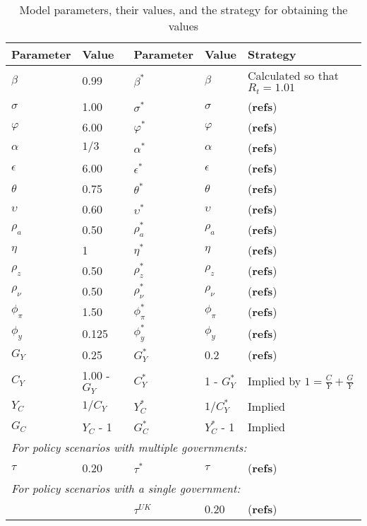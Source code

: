 \begin{table}[H] \label{table:model_parameters}
    \centering
    \begin{tabular}{ll|lll}
        Parameter & Value & Parameter & Value & Strategy \\
        \hline
        \hline
        $\beta$ & 0.99 & $\beta^*$ & $\beta$ & Calculated so that $R_t = 1.01$\\
        $\sigma$ & 1.00 & $\sigma^*$ & $\sigma$ & (\textbf{refs})\\
        $\varphi$ & 6.00 & $\varphi^*$ & $\varphi$ & (\textbf{refs})\\
        $\alpha$ & $1/3$ & $\alpha^*$ & $\alpha$ & (\textbf{refs})\\
        $\epsilon$ & 6.00 & $\epsilon^*$ & $\epsilon$ & (\textbf{refs})\\
        $\theta$ & 0.75 & $\theta^*$ & $\theta$ & (\textbf{refs})\\
        $\upsilon$ & 0.60 & $\upsilon^*$ & $\upsilon$ & (\textbf{refs})\\
        $\rho_a$ & 0.50 & $\rho_a^*$ & $\rho_a$ & (\textbf{refs})\\
        $\eta$ & 1 & $\eta^*$ & $\eta$ & (\textbf{refs})\\
        $\rho_z$ & 0.50 & $\rho_z^*$ & $\rho_z$ & (\textbf{refs})\\
        $\rho_\nu$ & 0.50 & $\rho^*_\nu$ & $\rho_\nu$ & (\textbf{refs})\\
        $\phi_\pi$ & 1.50 & $\phi^*_\pi$ & $\phi_\pi$ & (\textbf{refs})\\
        $\phi_y$ & 0.125 & $\phi^*_y$ & $\phi_y$ & (\textbf{refs})\\
        $G_Y$ & 0.25 & $G_Y^*$ & 0.2 & (\textbf{refs})\\
        $C_Y$ & 1.00 - $G_Y$ & $C_Y^*$ & 1 - $G_Y^*$ & Implied by $1=\frac{C}{Y} + \frac{G}{Y}$\\
        $Y_C$ & $1/{C_Y}$ & $Y_C^*$ & $1/{C_Y^*}$ & Implied \\
        $G_C$ & $Y_C$ - 1 & $G_C^*$ & $Y_C^*$ - 1 & Implied \\
        \multicolumn{5}{l}{\textit{For policy scenarios with multiple governments:}} \\
        $\tau$ & 0.20 & $\tau^*$ & $\tau$ & (\textbf{refs})\\
        \multicolumn{5}{l}{\textit{For policy scenarios with a single government:}} \\
         &&$\tau^{UK}$    & 0.20  & (\textbf{refs})\\
    \end{tabular}
    \caption{Model parameters, their values, and the strategy for obtaining the values}
\end{table}